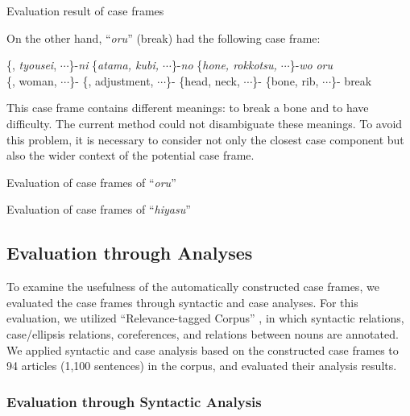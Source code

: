 \documentclass[english]{jnlp_1.4_rep}
\newcommand{\sm}[1]{}
\newcommand{\nom}{}
\newcommand{\acc}{}
\newcommand{\dat}{}
\newcommand{\gen}{}
\begin{document}
\begin{table}[t]
 \caption{Evaluation result of case frames}
 \label{Evaluation::CF}

\end{table}

On the other hand, ``\textit{oru}'' (break) had the following case frame:

\begin{exe}
 \ex
 \gll {\{\sm{quantity}, \textit{josei}, $\cdots$\}-\textit{ga}}
 {\{\sm{clause}, \textit{tyousei}, $\cdots$\}-\textit{ni}}
 {\{\textit{atama, kubi, $\cdots$}\}-\textit{no}}
 {\{\textit{hone, rokkotsu, $\cdots$}\}-\textit{wo}} \textit{oru} \\
 {\{\sm{quantity}, woman, $\cdots$\}-\nom} {\{\sm{clause}, adjustment, $\cdots$\}-\dat}
 {\{head, neck, $\cdots$\}-\gen} {\{bone, rib, $\cdots$\}-\acc} break \\
\end{exe}
This case frame contains different meanings: to break a bone and to have
difficulty. The current method could not disambiguate these meanings. To
avoid this problem, it is necessary to consider not only the closest
case component but also the wider context of the potential case frame.

\begin{table}[t]
\caption{Evaluation of case frames of ``\textit{oru}''}
 \label{Evaluation::CF-Oru}

\end{table}

\begin{table}[t]
 \caption{Evaluation of case frames of ``\textit{hiyasu}''}
 \label{Evaluation::CF-Hiyasu}

\end{table}


\subsection{Evaluation through Analyses}

To examine the usefulness of the automatically constructed case frames,
we evaluated the case frames through syntactic and case analyses. For
this evaluation, we utilized ``Relevance-tagged Corpus''
\cite{Kawahara2002c}, in which syntactic relations, case/ellipsis
relations, coreferences, and relations between nouns are annotated.
We applied syntactic and case analysis based on the constructed case
frames to 94 articles (1,100 sentences) in the corpus, and evaluated
their analysis results.


\subsubsection*{Evaluation through Syntactic Analysis}
\end{document}
